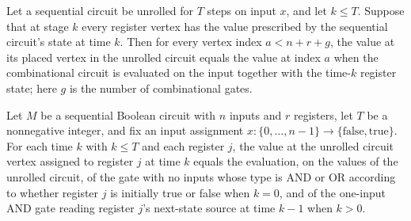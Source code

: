 \begin{theorem}
\label{BoolCircuit.SeqCircuit.unroll_block}
\leanok
{}
Let a sequential circuit be unrolled for $T$ steps on input $x$, and let $k\le T$.
Suppose that at stage $k$ every register vertex has the value prescribed by the
sequential circuit's state at time $k$. Then for every vertex index $a<n+r+g$, the value
at its placed vertex in the unrolled circuit equals the value at index $a$ when the
combinational circuit is evaluated on the input together with the time-$k$ register
state; here $g$ is the number of combinational gates.
\end{theorem}

\begin{theorem}
\label{BoolCircuit.SeqCircuit.unroll_reg}
\leanok
{}
Let $M$ be a sequential Boolean circuit with $n$ inputs and $r$ registers, let $T$ be a
nonnegative integer, and fix an input assignment
$x\colon\{0,\ldots,n-1\}\to\{\mathrm{false},\mathrm{true}\}$. For each time $k$ with
$k\le T$ and each register $j$, the value at the unrolled circuit vertex assigned to
register $j$ at time $k$ equals the evaluation, on the values of the unrolled circuit,
of the gate with no inputs whose type is AND or OR according to whether register $j$ is
initially true or false when $k=0$, and of the one-input AND gate reading register $j$'s
next-state source at time $k-1$ when $k>0$.
\end{theorem}

